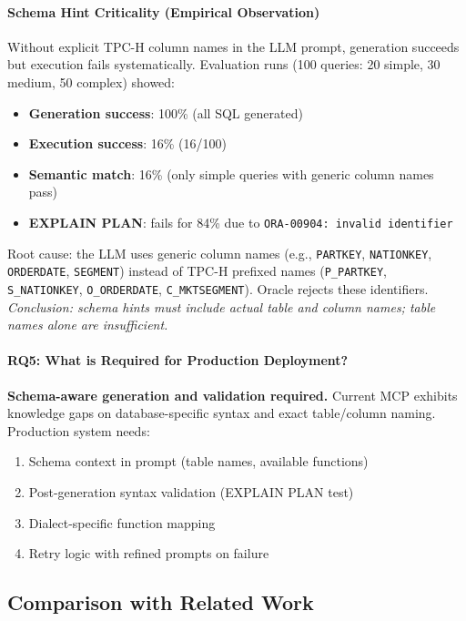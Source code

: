 \paragraph{Schema Hint Criticality (Empirical Observation)}
Without explicit TPC-H column names in the LLM prompt, generation succeeds but execution fails systematically. Evaluation runs (100 queries: 20 simple, 30 medium, 50 complex) showed:
\begin{itemize}
    \item \textbf{Generation success}: 100\% (all SQL generated)
    \item \textbf{Execution success}: 16\% (16/100)
    \item \textbf{Semantic match}: 16\% (only simple queries with generic column names pass)
    \item \textbf{EXPLAIN PLAN}: fails for 84\% due to \texttt{ORA-00904: invalid identifier}
\end{itemize}
Root cause: the LLM uses generic column names (e.g., \texttt{PARTKEY}, \texttt{NATIONKEY}, \texttt{ORDERDATE}, \texttt{SEGMENT}) instead of TPC-H prefixed names (\texttt{P\_PARTKEY}, \texttt{S\_NATIONKEY}, \texttt{O\_ORDERDATE}, \texttt{C\_MKTSEGMENT}). Oracle rejects these identifiers. \textit{Conclusion: schema hints must include actual table and column names; table names alone are insufficient.}

\paragraph{RQ5: What is Required for Production Deployment?}
\textbf{Schema-aware generation and validation required.} Current MCP exhibits knowledge gaps on database-specific syntax and exact table/column naming. Production system needs:
\begin{enumerate}
    \item Schema context in prompt (table names, available functions)
    \item Post-generation syntax validation (EXPLAIN PLAN test)
    \item Dialect-specific function mapping
    \item Retry logic with refined prompts on failure
\end{enumerate}

\subsection{Comparison with Related Work}

